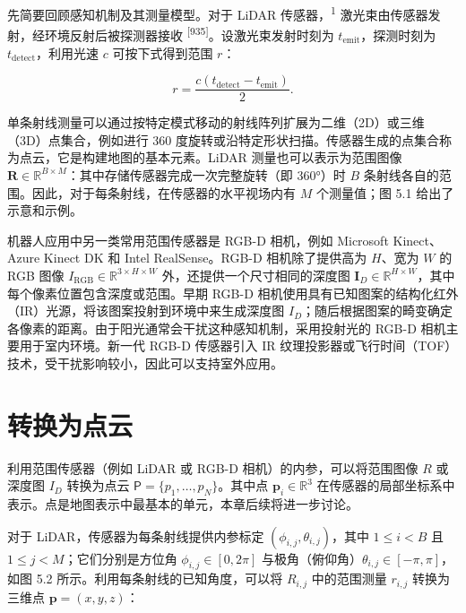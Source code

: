 先简要回顾感知机制及其测量模型。对于 LiDAR 传感器，\textsuperscript{1} 激光束由传感器发射，经环境反射后被探测器接收 \textsuperscript{[935]}。设激光束发射时刻为 $t _ { \mathrm{emit} }$，探测时刻为 $t _ { \mathrm{detect} }$，利用光速 $c$ 可按下式得到范围 $r$：

\begin{equation}
r = \frac {c (t _ {\mathrm{detect}} - t _ {\mathrm{emit}})}{2}.\tag{5.1}
\end{equation}

单条射线测量可以通过按特定模式移动的射线阵列扩展为二维（2D）或三维（3D）点集合，例如进行 360 度旋转或沿特定形状扫描。传感器生成的点集合称为点云，它是构建地图的基本元素。LiDAR 测量也可以表示为范围图像 $\pmb { R } \in \mathbb { R } ^ { B \times M }$：其中存储传感器完成一次完整旋转（即 360°）时 $B$ 条射线各自的范围。因此，对于每条射线，在传感器的水平视场内有 $M$ 个测量值；图 5.1 给出了示意和示例。

机器人应用中另一类常用范围传感器是 RGB-D 相机，例如 Microsoft Kinect、Azure Kinect DK 和 Intel RealSense。RGB-D 相机除了提供高为 $H$、宽为 $W$ 的 RGB 图像 $I _ { \mathrm {RGB} } \in \mathbb { R } ^ { 3 \times H \times W }$ 外，还提供一个尺寸相同的深度图 $\pmb { I } _ { D } \in \mathbb { R } ^ { H \times W }$，其中每个像素位置包含深度或范围。早期 RGB-D 相机使用具有已知图案的结构化红外（IR）光源，将该图案投射到环境中来生成深度图 $I _ { D }$；随后根据图案的畸变确定各像素的距离。由于阳光通常会干扰这种感知机制，采用投射光的 RGB-D 相机主要用于室内环境。新一代 RGB-D 传感器引入 IR 纹理投影器或飞行时间（TOF）技术，受干扰影响较小，因此可以支持室外应用。

\section{转换为点云}

利用范围传感器（例如 LiDAR 或 RGB-D 相机）的内参，可以将范围图像 $R$ 或深度图 $I _ { D }$ 转换为点云 $\mathsf { P } = \{ p _ { 1 } , \hdots , p _ { N } \}$。其中点 $\pmb { p } _ { i } \in \mathbb { R } ^ { 3 }$ 在传感器的局部坐标系中表示。点是地图表示中最基本的单元，本章后续将进一步讨论。

对于 LiDAR，传感器为每条射线提供内参标定 $( \phi _ { i , j } , \theta _ { i , j } )$，其中 $1 \leq i < B$ 且 $1 \leq j < M$；它们分别是方位角 $\phi _ { i , j } \in [ 0 , 2 \pi ]$ 与极角（俯仰角）$\theta _ { i , j } \in [ - \pi , \pi ]$，如图 5.2 所示。利用每条射线的已知角度，可以将 $R _ { i , j }$ 中的范围测量 $r _ { i , j }$ 转换为三维点 $\pmb { p } = ( x , y , z )$：

